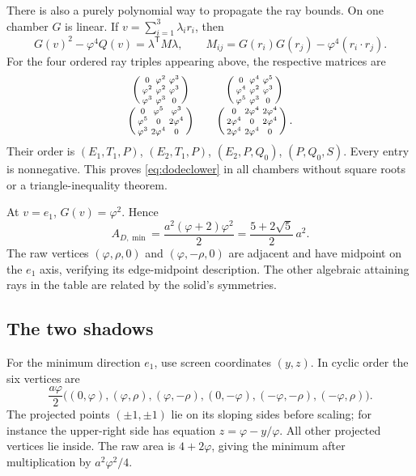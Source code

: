 \documentclass[11pt,a4paper]{article}
\newcommand{\ph}{\varphi}
\newcommand{\rr}{\rho}
\begin{document}
There is also a purely polynomial way to propagate the ray bounds. On one chamber $G$ is linear. If $v=\sum_{i=1}^3\lambda_ir_i$, then
\[
 G(v)^2-\ph^4Q(v)=\lambda^{\mathsf T}M\lambda,
 \qquad M_{ij}=G(r_i)G(r_j)-\ph^4(r_i\cdot r_j).
\]
For the four ordered ray triples appearing above, the respective matrices are
\[
\begin{array}{c@{\qquad}c}
\left(\begin{smallmatrix}0&\ph^2&\ph^3\\\ph^2&\ph^2&\ph^3\\\ph^3&\ph^3&0\end{smallmatrix}\right)&
\left(\begin{smallmatrix}0&\ph^4&\ph^5\\\ph^4&\ph^2&\ph^3\\\ph^5&\ph^3&0\end{smallmatrix}\right)\\[3mm]
\left(\begin{smallmatrix}0&\ph^5&\ph^3\\\ph^5&0&2\ph^4\\\ph^3&2\ph^4&0\end{smallmatrix}\right)&
\left(\begin{smallmatrix}0&2\ph^4&2\ph^4\\2\ph^4&0&2\ph^4\\2\ph^4&2\ph^4&0\end{smallmatrix}\right).
\end{array}
\]
Their order is $(E_1,T_1,P)$, $(E_2,T_1,P)$, $(E_2,P,Q_0)$, $(P,Q_0,S)$. Every entry is nonnegative. This proves \eqref{eq:dodeclower} in all chambers without square roots or a triangle-inequality theorem.

At $v=e_1$, $G(v)=\ph^2$. Hence
\[
 A_{D,\min}=\frac{a^2(\ph+2)\ph^2}{2}
            =\frac{5+2\sqrt5}{2}\,a^2.
\]
The raw vertices $(\ph,\rr,0)$ and $(\ph,-\rr,0)$ are adjacent and have midpoint on the $e_1$ axis, verifying its edge-midpoint description. The other algebraic attaining rays in the table are related by the solid's symmetries.

\subsection{The two shadows}
For the minimum direction $e_1$, use screen coordinates $(y,z)$. In cyclic order the six vertices are
\begin{equation}\label{eq:dodechex}
 \frac{a\ph}{2}\bigl((0,\ph),(\ph,\rr),(\ph,-\rr),
              (0,-\ph),(-\ph,-\rr),(-\ph,\rr)\bigr).
\end{equation}
The projected points $(\pm1,\pm1)$ lie on its sloping sides before scaling; for instance the upper-right side has equation $z=\ph-y/\ph$. All other projected vertices lie inside. The raw area is $4+2\ph$, giving the minimum after multiplication by $a^2\ph^2/4$.
\end{document}
